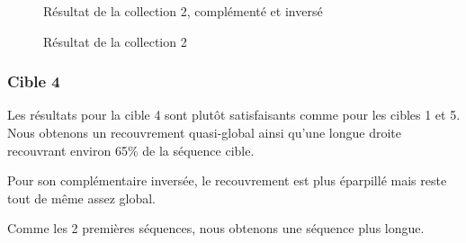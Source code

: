 \begin{figure}[!ht]
\begin{minipage}[c]{.46 \linewidth}
\begin{center}
			Résultat de la collection 2, complémenté et inversé
		\end{center}
	\end{minipage}
	\caption{Résultat de la collection 2}
\end{figure}

\FloatBarrier

\subsubsection*{Cible 4}

Les résultats pour la cible 4 sont plutôt satisfaisants comme pour les cibles 1
et 5. Nous obtenons un recouvrement quasi-global ainsi qu'une longue droite
recouvrant environ 65\% de la séquence cible.

Pour son complémentaire inversée, le recouvrement est plus éparpillé mais reste
tout de même assez global.

Comme les 2 premières séquences, nous obtenons une séquence plus longue.

